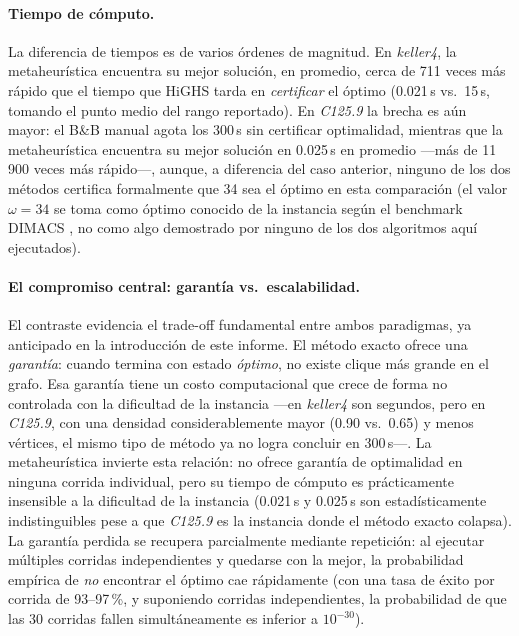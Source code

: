 \paragraph{Tiempo de cómputo.} La diferencia de tiempos es de varios órdenes de magnitud. En \textit{keller4}, la metaheurística encuentra su mejor solución, en promedio, cerca de 711 veces más rápido que el tiempo que HiGHS tarda en \emph{certificar} el óptimo (0.021\,s vs.\ 15\,s, tomando el punto medio del rango reportado). En \textit{C125.9} la brecha es aún mayor: el B\&B manual agota los 300\,s sin certificar optimalidad, mientras que la metaheurística encuentra su mejor solución en 0.025\,s en promedio —más de 11\,900 veces más rápido—, aunque, a diferencia del caso anterior, ninguno de los dos métodos certifica formalmente que 34 sea el óptimo en esta comparación (el valor $\omega=34$ se toma como óptimo conocido de la instancia según el benchmark DIMACS \parencite{mascia_dimacs}, no como algo demostrado por ninguno de los dos algoritmos aquí ejecutados).

\paragraph{El compromiso central: garantía vs.\ escalabilidad.} El contraste evidencia el trade-off fundamental entre ambos paradigmas, ya anticipado en la introducción de este informe. El método exacto ofrece una \emph{garantía}: cuando termina con estado \textit{óptimo}, no existe clique más grande en el grafo. Esa garantía tiene un costo computacional que crece de forma no controlada con la dificultad de la instancia —en \textit{keller4} son segundos, pero en \textit{C125.9}, con una densidad considerablemente mayor (0.90 vs.\ 0.65) y menos vértices, el mismo tipo de método ya no logra concluir en 300\,s—. La metaheurística invierte esta relación: no ofrece garantía de optimalidad en ninguna corrida individual, pero su tiempo de cómputo es prácticamente insensible a la dificultad de la instancia (0.021\,s y 0.025\,s son estadísticamente indistinguibles pese a que \textit{C125.9} es la instancia donde el método exacto colapsa). La garantía perdida se recupera parcialmente mediante repetición: al ejecutar múltiples corridas independientes y quedarse con la mejor, la probabilidad empírica de \emph{no} encontrar el óptimo cae rápidamente (con una tasa de éxito por corrida de 93--97\,\%, y suponiendo corridas independientes, la probabilidad de que las 30 corridas fallen simultáneamente es inferior a $10^{-30}$).

